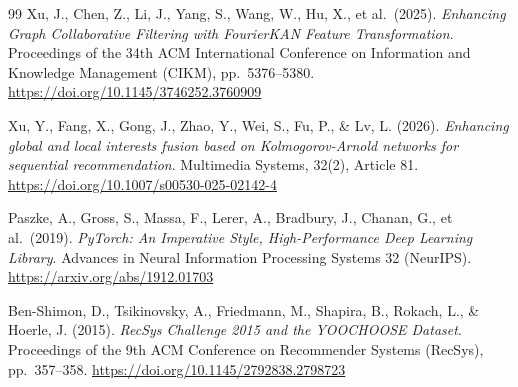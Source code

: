 \begin{thebibliography}{99}
Xu, J., Chen, Z., Li, J., Yang, S., Wang, W., Hu, X., et al.\ (2025).
\textit{Enhancing Graph Collaborative Filtering with FourierKAN Feature Transformation}.
Proceedings of the 34th ACM International Conference on Information and Knowledge Management (CIKM), pp.\ 5376--5380. \url{https://doi.org/10.1145/3746252.3760909}

Xu, Y., Fang, X., Gong, J., Zhao, Y., Wei, S., Fu, P., \& Lv, L. (2026).
\textit{Enhancing global and local interests fusion based on Kolmogorov-Arnold networks for sequential recommendation}.
Multimedia Systems, 32(2), Article 81. \url{https://doi.org/10.1007/s00530-025-02142-4}

Paszke, A., Gross, S., Massa, F., Lerer, A., Bradbury, J., Chanan, G., et al.\ (2019).
\textit{PyTorch: An Imperative Style, High-Performance Deep Learning Library}.
Advances in Neural Information Processing Systems 32 (NeurIPS). \url{https://arxiv.org/abs/1912.01703}

Ben-Shimon, D., Tsikinovsky, A., Friedmann, M., Shapira, B., Rokach, L., \& Hoerle, J. (2015).
\textit{RecSys Challenge 2015 and the YOOCHOOSE Dataset}.
Proceedings of the 9th ACM Conference on Recommender Systems (RecSys), pp.\ 357--358. \url{https://doi.org/10.1145/2792838.2798723}

\end{thebibliography}
